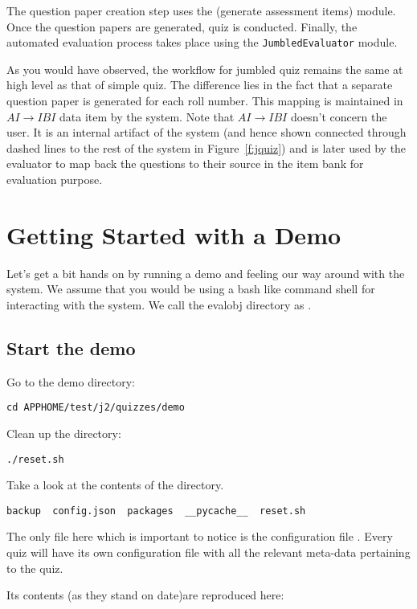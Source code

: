 \documentclass[12pt]{report}
\makeatletter
\newcommand{\kctt}[1]{{\color{Red}{\lstinline[basicstyle=\ttfamily, mathescape=true]@#1@}}}
\makeatother
\begin{document}
The question paper creation step uses the \kctt{genAIs} (generate assessment items) module. Once the question papers are generated, quiz is conducted. Finally, the automated evaluation process takes place using the \lstinline[style=pc]@JumbledEvaluator@ module.

As you would have observed, the workflow for jumbled quiz remains the same at high level as that of simple quiz. The difference lies in the fact that a separate question paper is generated for each roll number. This mapping is maintained in $AI\rightarrow IBI$ data item by the system. Note that $AI\rightarrow IBI$ doesn't concern the user. It is an internal artifact of the system (and hence shown connected through dashed lines to the rest of the system in Figure~\ref{f:jquiz}) and is later used by the evaluator to map back the questions to their source in the item bank for evaluation purpose.
\section{Getting Started with a Demo}
Let's get a bit hands on by running a demo and feeling our way around with the system. We assume that you would be using a bash like command shell for interacting with the system. We call the evalobj directory as \kctt{APPHOME}.
\subsection{Start the demo}

Go to the demo directory:
\begin{lstlisting}[style=oc]
cd APPHOME/test/j2/quizzes/demo
\end{lstlisting}


Clean up the directory:
\begin{lstlisting}[style=oc]
./reset.sh
\end{lstlisting}

Take a look at the contents of the directory.
\begin{lstlisting}[style=oc]
backup  config.json  packages  __pycache__  reset.sh
\end{lstlisting}

The only file here which is important to notice is the configuration file \kctt{config.json}. Every quiz will have its own configuration file with all the relevant meta-data pertaining to the quiz.

Its contents (as they stand on date)are reproduced here:


\end{document}
